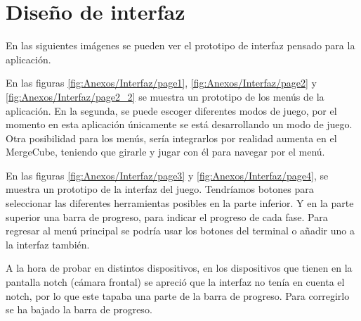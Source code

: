 \section{Diseño de interfaz}

En las siguientes imágenes se pueden ver el prototipo de interfaz pensado para la aplicación. 

En las figuras \ref{fig:Anexos/Interfaz/page1}, \ref{fig:Anexos/Interfaz/page2} y \ref{fig:Anexos/Interfaz/page2_2} se muestra un prototipo de los menús de la aplicación. En la segunda, se puede escoger diferentes modos de juego, por el momento en esta aplicación únicamente se está desarrollando un modo de juego. 
Otra posibilidad para los menús, sería integrarlos por realidad aumenta en el MergeCube, teniendo que girarle y jugar con él para navegar por el menú.

En las figuras \ref{fig:Anexos/Interfaz/page3} y \ref{fig:Anexos/Interfaz/page4}, se muestra un prototipo de la interfaz del juego. Tendríamos botones para seleccionar las diferentes herramientas posibles en la parte inferior. Y en la parte superior una barra de progreso, para indicar el progreso de cada fase. Para regresar al menú principal se podría usar los botones del terminal o añadir uno a la interfaz también.




A la hora de probar en distintos dispositivos, en los dispositivos que tienen en la pantalla notch (cámara frontal) se apreció que la interfaz no tenía en cuenta el notch, por lo que este tapaba una parte de la barra de progreso. Para corregirlo se ha bajado la barra de progreso.

